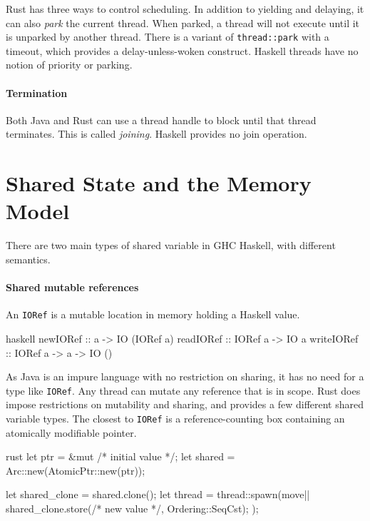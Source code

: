 Rust has three ways to control scheduling.  In addition to yielding
and delaying, it can also \emph{park} the current thread.  When
parked, a thread will not execute until it is unparked by another
thread.  There is a variant of \verb|thread::park| with a timeout,
which provides a delay-unless-woken construct.  Haskell threads have
no notion of priority or parking.

\paragraph{Termination}
Both Java and Rust can use a thread handle to block until that thread
terminates.  This is called \emph{joining}.  Haskell provides no join
operation.

\section{Shared State and the Memory Model}
\label{sec:concurrent_haskell-mmodel}

There are two main types of shared variable in GHC Haskell, with different
semantics.

\paragraph{Shared mutable references}
An \verb|IORef| is a mutable location in memory holding a Haskell
value.

\begin{listing}
\centering
\begin{cminted}{haskell}
newIORef   :: a -> IO (IORef a)
readIORef  :: IORef a -> IO a
writeIORef :: IORef a -> a -> IO ()
\end{cminted}
\caption{Shared mutable references in Haskell.}\label{lst:smref_haskell}
\end{listing}

As Java is an impure language with no restriction on sharing, it has
no need for a type like \verb|IORef|.  Any thread can mutate any
reference that is in scope.  Rust does impose restrictions on
mutability and sharing, and provides a few different shared variable
types.  The closest to \verb|IORef| is a reference-counting box
containing an atomically modifiable pointer.

\begin{listing}
\centering
\begin{cminted}{rust}
let ptr = &mut /* initial value */;
let shared = Arc::new(AtomicPtr::new(ptr));

let shared_clone = shared.clone();
let thread = thread::spawn(move|| {
    shared_clone.store(/* new value */, Ordering::SeqCst);
});
\end{cminted}
\caption{Shared mutable references in Rust.}\label{lst:smref_rust}
\end{listing}

